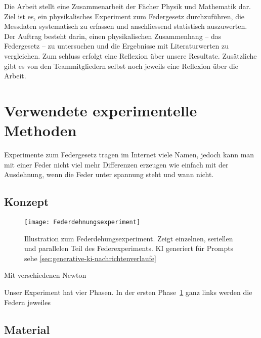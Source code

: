 \documentclass[../main.tex]{subfiles} %
\begin{document}
        Die Arbeit stellt eine Zusammenarbeit der Fächer Physik und Mathematik dar.
        Ziel ist es, ein physikalisches Experiment zum Federgesetz durchzuführen, die Messdaten systematisch zu erfassen und anschliessend statistisch auszuwerten.
        Der Auftrag besteht darin, einen physikalischen Zusammenhang – das Federgesetz – zu untersuchen und die Ergebnisse mit Literaturwerten zu vergleichen.
        Zum schluss erfolgt eine Reflexion über unsere Resultate.
        Zusätzliche gibt es von den Teammitgliedern selbst noch jeweils eine Reflexion über die Arbeit.


    \section{Verwendete experimentelle Methoden}\label{sec:verwendete-experimentelle-methoden}

        Experimente zum Federgesetz tragen im Internet viele Namen, jedoch kann man mit einer Feder nicht viel mehr Differenzen
        erzeugen wie einfach mit der Ausdehnung, wenn die Feder unter spannung steht und wann nicht.

        \subsection{Konzept}\label{subsec:konzept}

            \begin{figure}[h]
                \centering
                \texttt{[image: Federdehnungsexperiment]}
                \caption{Illustration zum Federdehungsexperiment. Zeigt einzelnen, seriellen und parallelen Teil des Federexperiments. KI generiert für Prompts sehe \ref{sec:generative-ki-nachrichtenverlaufe}}
                \label{fig:mesh1}
            \end{figure}

            Mit verschiedenen Newton

            Unser Experiment hat vier Phasen.
            In der ersten Phase~\ref{fig:mesh1} ganz links werden die Federn jeweiles

        \subsection{Material}\label{subsec:material}
\end{document}
